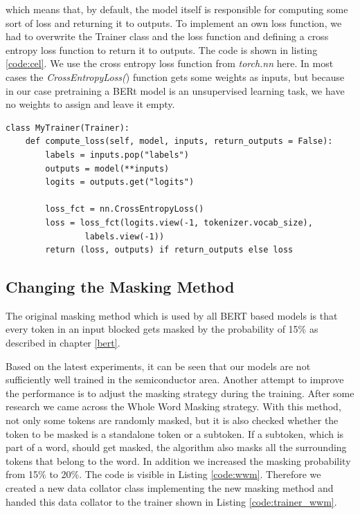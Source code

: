 which means that, by default, the model itself is responsible for computing some sort of loss and returning it to outputs. To implement an own loss function, we had to overwrite the Trainer class and the loss function and defining a cross entropy loss function to return it to outputs. The code is shown in listing \ref{code:cel}. We use the cross entropy loss function from \textit{torch.nn} here. In most cases the \textit{CrossEntropyLoss(}) function gets some weights as inputs, but because in our case pretraining a BERt model is an unsupervised learning task, we have no weights to assign and leave it empty.

\begin{code}
	\label{code:cel}
\begin{verbatim}
class MyTrainer(Trainer):
	def compute_loss(self, model, inputs, return_outputs = False):
		labels = inputs.pop("labels")
		outputs = model(**inputs)
		logits = outputs.get("logits")

		loss_fct = nn.CrossEntropyLoss()
		loss = loss_fct(logits.view(-1, tokenizer.vocab_size),
				labels.view(-1))
		return (loss, outputs) if return_outputs else loss
\end{verbatim}
\end{code}

\subsection{Changing the Masking Method}
The original masking method which is used by all BERT based models is that every token in an input blocked gets masked by the probability of 15\% as described in chapter \ref{bert}. 

Based on the latest experiments, it can be seen that our models are not sufficiently well trained in the semiconductor area. Another attempt to improve the performance is to adjust the masking strategy during the training. After some research we came across the Whole Word Masking strategy. With this method, not only some tokens are randomly masked, but it is also checked whether the token to be masked is a standalone token or a subtoken. If a subtoken, which is part of a word, should get masked, the algorithm also masks all the surrounding tokens that belong to the word. In addition we increased the masking probability from 15\% to 20\%. The code is visible in Listing \ref{code:wwm}. Therefore we created a new data collator class implementing the new masking method and handed this data collator to the trainer shown in Listing \ref{code:trainer_wwm}.

